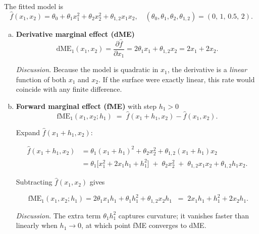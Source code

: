 \loesung
{

\vspace{0.5em}
The fitted model is
\[
  \hat{f}(x_1,x_2)=\theta_0+\theta_1 x_1^{2}+\theta_2 x_2^{2}+ \theta_{1,2}x_1x_2,
  \quad
  (\theta_0,\theta_1,\theta_2,\theta_{1,2})=(0,\,1,\,0.5,\,2).
\]

\begin{enumerate}[a)]
\item \textbf{Derivative marginal effect (dME)}\\[0.1em]
\[
  \text{dME}_1(x_1,x_2)=
  \frac{\partial\hat f}{\partial x_1}
  =2\theta_1x_1+\theta_{1,2}x_2
  =2x_1+2x_2.
\]

\emph{Discussion}.  
Because the model is quadratic in \(x_1\), the derivative is a \emph{linear}
function of both \(x_1\) and \(x_2\).  
If the surface were exactly linear, this rate would coincide with any finite
difference.

\item \textbf{Forward marginal effect (fME)} with step \(h_1>0\)\\[0.1em]

\[
  \text{fME}_1(x_1,x_2;h_1) \;=\;
  \hat f(x_1+h_1,x_2)-\hat f(x_1,x_2).
\]

Expand \(\hat f(x_1+h_1,x_2)\):

\begin{align*}
  \hat f(x_1\!+\!h_1,x_2)
  &=\theta_1(x_1+h_1)^2+\theta_2x_2^2+\theta_{1,2}(x_1+h_1)x_2 \\
  &=\theta_1\bigl[x_1^2+2x_1h_1+h_1^2\bigr]
    \;+\;\theta_2x_2^2
    \;+\;\theta_{1,2}x_1x_2+\theta_{1,2}h_1x_2.
\end{align*}

Subtracting \(\hat f(x_1,x_2)\) gives

\[
  \boxed{\;
  \text{fME}_1(x_1,x_2;h_1)=
  2\theta_1x_1h_1+\theta_1h_1^{2}+\theta_{1,2}x_2h_1
  \;}
  \;=\;
  2x_1h_1+h_1^{2}+2x_2h_1 .
\]

\emph{Discussion}.  
The extra term \(\theta_1h_1^{2}\) captures curvature; it vanishes faster than linearly when \(h_1\to0\), at which point fME converges to dME.




\end{enumerate}}
